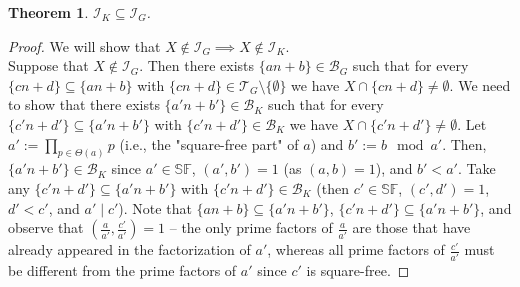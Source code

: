\documentclass{amsart}
\newtheorem{thm}{Theorem}[section]
\theoremstyle{definition}
\theoremstyle{definition}
\newcommand{\I}{\mathcal I}
\newcommand{\T}{\mathcal{T}}
\newcommand{\B}{\mathcal{B}}
\newcommand{\SqrFr}{\mathbb{SF}}
\begin{document}
\begin{thm}
$\I_K \subseteq \I_G$.
\end{thm}

\begin{proof}
We will show that $X \not\in \I_G \implies X \not\in \I_K$.\\
Suppose that $X \not\in \I_G$. Then there exists $\{an+b\}\in \B_G$ such that for every $\{cn+d\}\subseteq \{an+b\}$ with $\{cn+d\}\in \T_G\setminus\{\emptyset\}$ we have $X\cap \{cn+d\} \neq \emptyset$.
We need to show that there exists $\{a'n+b'\}\in \B_K$ such that for every $\{c'n+d'\}\subseteq \{a'n+b'\}$ with $\{c'n+d'\}\in \B_K$ we have $X\cap \{c'n+d'\} \neq \emptyset$.
Let $a' := \prod_{p\in\Theta(a)}{p}$ (i.e., the "square-free part" of $a$) and $b' := b \mod a'$. Then, $\{a'n+b'\} \in \B_K$ since $a' \in \SqrFr$, $(a',b') = 1$ (as $(a,b) = 1$), and $b'<a'$.
Take any $\{c'n+d'\} \subseteq \{a'n+b'\}$ with $\{c'n+d'\}\in \B_K$ (then $c' \in \SqrFr$, $(c',d')=1$, $d'<c'$, and $a'\mid c'$).
Note that $\{an+b\}\subseteq \{a'n+b'\}$, $\{c'n+d'\}\subseteq \{a'n+b'\}$, and observe that $\left(\frac{a}{a'}, \frac{c'}{a'}\right) = 1$ -- the only prime factors of $\frac{a}{a'}$ are those that have already appeared in the factorization of $a'$, whereas all prime factors of $\frac{c'}{a'}$ must be different from the prime factors of $a'$ since $c'$ is square-free. 

\end{proof}
\end{document}
